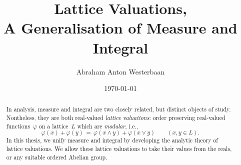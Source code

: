 \documentclass[main.tex]{subfiles}
\begin{document}
\title[A Generalisation of Measure and Integral]{Lattice Valuations,\\
A Generalisation of Measure and Integral}

\author[A.A.~Westerbaan]{Abraham Anton Westerbaan}
\date{\today \quad{\tiny \version}}
\maketitle

\begin{abstract}
In analysis,
measure and integral are two closely related,
but distinct objects of study.
Nontheless,
they are both real-valued \emph{lattice valuations}:
order preserving real-valued functions~$\varphi$
on a lattice~$L$
which are \emph{modular}, i.e.,
\begin{equation*}
\varphi(x) + \varphi(y) 
\,=\, 
\varphi(x\wedge y) + \varphi(x\vee y)\qquad(x,y\in L).
\end{equation*}
In this thesis,
we unify measure and integral
by developing the analytic theory of lattice valuations.
We allow these lattice valuations
to take their values from the reals,
or any suitable ordered Abelian group.
\end{abstract}
\end{document}
